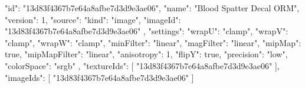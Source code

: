 {
  "id": "13d83f4367b7e64a8afbe7d3d9e3ae06",
  "name": "Blood Spatter Decal ORM",
  "version": 1,
  "source": {
    "kind": "image",
    "imageId": "13d83f4367b7e64a8afbe7d3d9e3ae06"
  },
  "settings": {
    "wrapU": "clamp",
    "wrapV": "clamp",
    "wrapW": "clamp",
    "minFilter": "linear",
    "magFilter": "linear",
    "mipMap": true,
    "mipMapFilter": "linear",
    "anisotropy": 1,
    "flipY": true,
    "precision": "low",
    "colorSpace": "srgb"
  },
  "textureIds": [
    "13d83f4367b7e64a8afbe7d3d9e3ae06"
  ],
  "imageIds": [
    "13d83f4367b7e64a8afbe7d3d9e3ae06"
  ]
}

